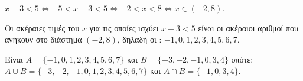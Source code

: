 
\begin{alist}
\item $x - 3 < 5 \Leftrightarrow -5 < x - 3 < 5 \Leftrightarrow -2 < x < 8 \Leftrightarrow x \in (-2, 8)$.

\item Οι ακέραιες τιμές του $x$ για τις οποίες ισχύει $x - 3 < 5$ είναι οι ακέραιοι αριθμοί που
ανήκουν στο διάστημα $(-2, 8)$, δηλαδή οι : $-1, 0, 1, 2, 3, 4, 5, 6, 7$.

\item Είναι $A = \{-1,0,1,2,3,4,5,6,7\}$ και $B = \{-3, -2, -1,0,3,4\}$ οπότε:
$A \cup B = \{-3, -2, -1,0,1,2,3,4,5,6,7\}$ και $A \cap B = \{-1,0,3,4\}$.
\end{alist}

